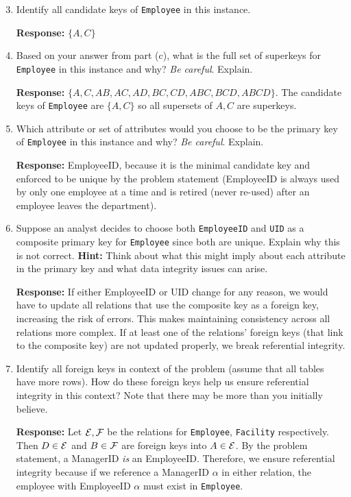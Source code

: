 \documentclass{report}
\renewcommand{\it}[1]{\textit{{#1}}}
\renewcommand{\bf}[1]{\textbf{{#1}}}
\renewcommand{\tt}[1]{\texttt{{#1}}}
\begin{document}
\begin{enumerate}[label=(\alph*)]
    \setcounter{enumi}{2}
    \item Identify all candidate keys of \tt{Employee} in this instance. \vspace{2pt}

        \bf{Response:} $\{A, C\}$

    \item Based on your answer from part (c), what is the full set of superkeys for
        \tt{Employee} in this instance and why? \it{Be careful}. Explain. \vspace{2pt}

        \bf{Response:} $\{A, C, AB, AC, AD, BC, CD, ABC, BCD, ABCD\}$. The candidate keys of \tt{Employee} are
        $\{A, C\}$ so all supersets of $A, C$ are superkeys.

    \item Which attribute or set of attributes would you choose to be the primary key of 
        \tt{Employee} in this instance and why? \it{Be careful}. Explain. \vspace{2pt}

        \bf{Response:} EmployeeID, because it is the minimal candidate key and enforced to
        be unique by the problem statement (EmployeeID is always used by only one employee at a time 
        and is retired (never re-used) after an employee leaves the department).

    \item Suppose an analyst decides to choose both \tt{EmployeeID} and \tt{UID} 
        as a composite primary key for \tt{Employee} since both are unique. Explain why 
        this is not correct. \bf{Hint:} Think about what this might imply about each 
        attribute in the primary key and what data integrity issues can arise. \vspace{2pt}

        \bf{Response:} If either EmployeeID or UID change for any reason, we would have to update
        all relations that use the composite key as a foreign key, increasing the risk of errors. 
        This makes maintaining consistency across all relations more complex. If at least one of
        the relations' foreign keys (that link to the composite key) are not updated properly, we 
        break referential integrity.

    \item Identify all foreign keys in context of the problem (assume that all tables have more 
        rows). How do these foreign keys help us ensure referential integrity in this context? Note 
        that there may be more than you initially believe. \vspace{2pt}

        \bf{Response:} Let $\cal{E}, \cal{F}$ be the relations for \tt{Employee}, \tt{Facility} 
        respectively. Then $D \in \cal{E}$ and $B \in \cal{F}$ are foreign keys into $A \in \cal{E}$.
        By the problem statement, a ManagerID \it{is} an EmployeeID. Therefore, we ensure referential
        integrity because if we reference a ManagerID $\alpha$ in either relation, the employee 
        with EmployeeID $\alpha$ must exist in \tt{Employee}.
\end{enumerate}
\end{document}
